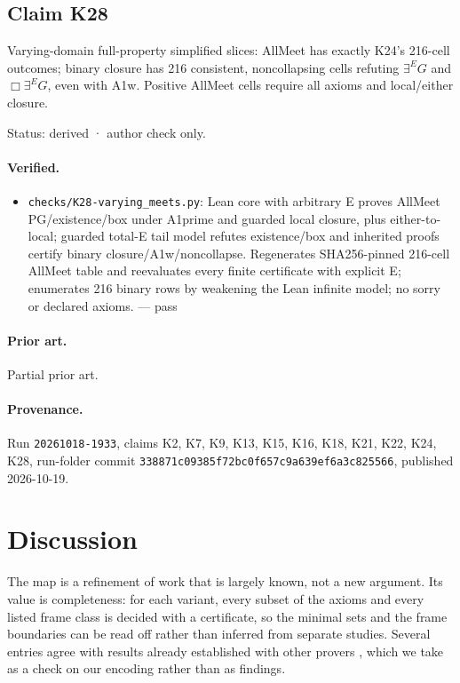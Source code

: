 \documentclass{article}
\begin{document}
\subsection*{Claim K28}

Varying-domain full-property simplified slices: AllMeet has exactly K24’s 216-cell outcomes; binary closure has 216 consistent, noncollapsing cells refuting $\exists^E G$ and $\Box\exists^E G$, even with A1w. Positive AllMeet cells require all axioms and local/either closure.

Status: derived · author check only.

\paragraph{Verified.}
\begin{itemize}
\item \texttt{checks/K28-varying\_meets.py}: Lean core with arbitrary E proves AllMeet PG/existence/box under A1prime and guarded local closure, plus either-to-local; guarded total-E tail model refutes existence/box and inherited proofs certify binary closure/A1w/noncollapse. Regenerates SHA256-pinned 216-cell AllMeet table and reevaluates every finite certificate with explicit E; enumerates 216 binary rows by weakening the Lean infinite model; no sorry or declared axioms. --- pass
\end{itemize}

\paragraph{Prior art.} Partial prior art.


\paragraph{Provenance.}
Run \texttt{20261018-1933}, claims K2, K7, K9, K13, K15, K16, K18, K21, K22, K24, K28, run-folder commit \texttt{338871c09385f72bc0f657c9a639ef6a3c825566}, published 2026-10-19.

\section{Discussion}

The map is a refinement of work that is largely known, not a new argument. Its value is
completeness: for each variant, every subset of the axioms and every listed frame class is decided
with a certificate, so the minimal sets and the frame boundaries can be read off rather than
inferred from separate studies. Several entries agree with results already established with
other provers \cite{benzmueller2025notes,benzmueller2026lean,benzmueller2017hajek}, which we take
as a check on our encoding rather than as findings.
\end{document}
